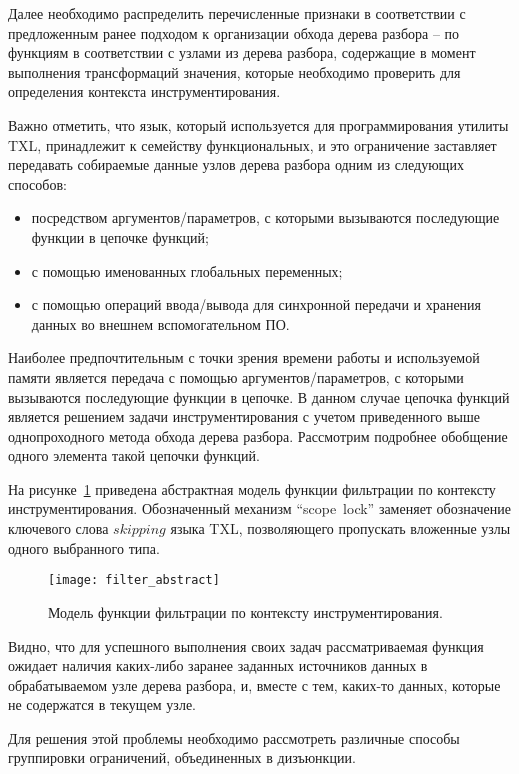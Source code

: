 Далее необходимо распределить перечисленные признаки в соответствии с предложенным ранее подходом к организации обхода дерева разбора -- по функциям в соответствии с узлами из дерева разбора, содержащие в момент выполнения трансформаций значения, которые необходимо проверить для определения контекста инструментирования.

Важно отметить, что язык, который используется для программирования утилиты TXL, принадлежит к семейству функциональных, и это ограничение заставляет передавать собираемые данные узлов дерева разбора одним из следующих способов:
\begin{itemize}[noitemsep]
  \item посредством аргументов/параметров, с которыми вызываются последующие функции в цепочке функций;
  \item с помощью именованных глобальных переменных;
  \item с помощью операций ввода/вывода для синхронной передачи и хранения данных во внешнем вспомогательном ПО.
\end{itemize}

Наиболее предпочтительным с точки зрения времени работы и используемой памяти является передача с помощью аргументов/параметров, с которыми вызываются последующие функции в цепочке.
В данном случае цепочка функций является решением задачи инструментирования с учетом приведенного выше однопроходного метода обхода дерева разбора.
Рассмотрим подробнее обобщение одного элемента такой цепочки функций.

На рисунке~\ref{fig:filter_abstract} приведена абстрактная модель функции фильтрации по контексту инструментирования.
Обозначенный механизм ``scope~lock'' заменяет обозначение ключевого слова $skipping$ языка TXL, позволяющего пропускать вложенные узлы одного выбранного типа.

\begin{figure}[!h]
	\centering
	\texttt{[image: filter\_abstract]}
	\caption{Модель функции фильтрации по контексту инструментирования.}
	\label{fig:filter_abstract}
\end{figure}

Видно, что для успешного выполнения своих задач рассматриваемая функция ожидает наличия каких-либо заранее заданных источников данных в обрабатываемом узле дерева разбора, и, вместе с тем, каких-то данных, которые не содержатся в текущем узле.

Для решения этой проблемы необходимо рассмотреть различные способы группировки ограничений, объединенных в дизъюнкции.

